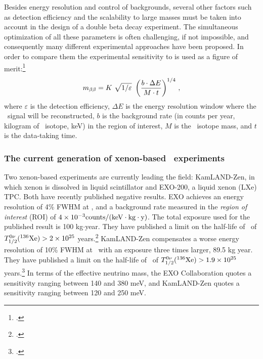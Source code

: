 Besides energy resolution and control of backgrounds, several other factors such as detection efficiency and the scalability to large masses must be taken into account in the design of a double beta decay experiment. The simultaneous optimization of all these parameters is often challenging, if not impossible, and consequently many different experimental approaches have been proposed. In order to compare them the experimental sensitivity to \mbb is used as a figure of merit:\footcite{GomezCadenas:2010gs}
\begin{equation}
\mbb = K \ \sqrt{1/\varepsilon} \ \left(\frac{b\cdot\Delta E}{M\cdot t} \right)^{1/4}\, ,
\label{eq:mbb}
\end{equation}
where $\varepsilon$ is the detection efficiency, $\Delta E$ is the energy resolution window where the \bbonu\ signal will be reconstructed, $b$ is the background rate (in counts per year, kilogram of \bb\ isotope, keV) in the region of interest, $M$ is the \bb\ isotope mass, and $t$ is the data-taking time. 


\subsubsection*{The current generation of xenon-based \bbonu\ experiments}
 
 Two xenon-based experiments are currently leading the field: KamLAND-Zen, in which xenon is dissolved in liquid scintillator and EXO-200, a liquid xenon (LXe) TPC. Both have recently published negative results. 
 EXO achieves an energy resolution of 4\% FWHM at \Qbb, and a background rate measured in the \emph{region of interest} (ROI) of $ 4 \times 10^{-3}\rm counts/(keV \cdot kg \cdot y)$. The total exposure used for the published result is 100 kg$\cdot$year. They have published a limit on the half-life of \bbonu\ of $T_{1/2}^{0\nu}({}^{136}\rm Xe) > 2 \times 10^{25}$ years.\footcite{Auger:2012ar} 
KamLAND-Zen compensates a worse energy resolution of 10\% FWHM at \Qbb\ with an exposure three times larger, 89.5 kg year. They have published a limit on the half-life of \bbonu\ of $T_{1/2}^{0\nu}({}^{136}\rm Xe) > 1.9 \times 10^{25}$ years.\footcite{Gando:2012zm} In terms of the effective neutrino mass, the EXO Collaboration quotes a sensitivity ranging between 140 and 380 meV, and KamLAND-Zen quotes a sensitivity ranging between 120 and 250 meV. 


